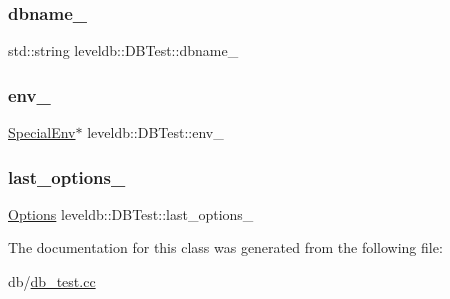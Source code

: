 \mbox{\label{classleveldb_1_1_d_b_test_ab7eb9815f522ad154816d72d1cc23a86}} 
\subsubsection{\texorpdfstring{dbname\_}{dbname\_}}
{\footnotesize\ttfamily std\+::string leveldb\+::\+D\+B\+Test\+::dbname\+\_\+}

\mbox{\label{classleveldb_1_1_d_b_test_ae6bb66675fe5419ed647efd1bfd332f8}} 
\subsubsection{\texorpdfstring{env\_}{env\_}}
{\footnotesize\ttfamily \mbox{\hyperlink{classleveldb_1_1_special_env}{Special\+Env}}$\ast$ leveldb\+::\+D\+B\+Test\+::env\+\_\+}

\mbox{\label{classleveldb_1_1_d_b_test_adc05df912917d8de411d0672af04330f}} 
\subsubsection{\texorpdfstring{last\_options\_}{last\_options\_}}
{\footnotesize\ttfamily \mbox{\hyperlink{structleveldb_1_1_options}{Options}} leveldb\+::\+D\+B\+Test\+::last\+\_\+options\+\_\+}



The documentation for this class was generated from the following file\+:\begin{DoxyCompactItemize}
\item 
db/\mbox{\hyperlink{db__test_8cc}{db\+\_\+test.\+cc}}\end{DoxyCompactItemize}
